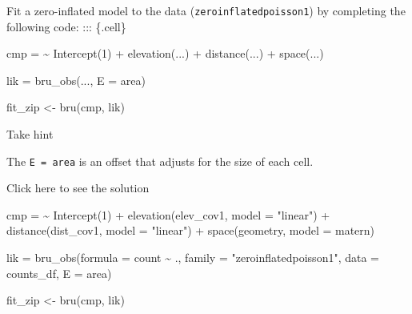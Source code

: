 \documentclass[
  letterpaper,
  DIV=11,
  numbers=noendperiod]{scrartcl}
\newenvironment{Shaded}{\begin{snugshade}}{\end{snugshade}}
\newcommand{\AttributeTok}[1]{\textcolor[rgb]{0.40,0.45,0.13}{#1}}
\newcommand{\DecValTok}[1]{\textcolor[rgb]{0.68,0.00,0.00}{#1}}
\newcommand{\ErrorTok}[1]{\textcolor[rgb]{0.68,0.00,0.00}{#1}}
\newcommand{\FunctionTok}[1]{\textcolor[rgb]{0.28,0.35,0.67}{#1}}
\newcommand{\NormalTok}[1]{\textcolor[rgb]{0.00,0.23,0.31}{#1}}
\newcommand{\OtherTok}[1]{\textcolor[rgb]{0.00,0.23,0.31}{#1}}
\newcommand{\SpecialCharTok}[1]{\textcolor[rgb]{0.37,0.37,0.37}{#1}}
\newcommand{\StringTok}[1]{\textcolor[rgb]{0.13,0.47,0.30}{#1}}
\begin{document}
\begin{tcolorbox}[enhanced jigsaw, bottomrule=.15mm, colbacktitle=quarto-callout-warning-color!10!white, toptitle=1mm, toprule=.15mm, colframe=quarto-callout-warning-color-frame, opacitybacktitle=0.6, opacityback=0, breakable, bottomtitle=1mm, left=2mm, titlerule=0mm, colback=white, rightrule=.15mm, leftrule=.75mm, arc=.35mm, title={Task}, coltitle=black]

Fit a zero-inflated model to the data (\texttt{zeroinflatedpoisson1}) by
completing the following code: ::: \{.cell\}

\begin{Shaded}
\begin{Highlighting}[]
\NormalTok{cmp }\OtherTok{=} \ErrorTok{\textasciitilde{}} \FunctionTok{Intercept}\NormalTok{(}\DecValTok{1}\NormalTok{) }\SpecialCharTok{+} \FunctionTok{elevation}\NormalTok{(...) }\SpecialCharTok{+} \FunctionTok{distance}\NormalTok{(...) }\SpecialCharTok{+} \FunctionTok{space}\NormalTok{(...)}

\NormalTok{lik }\OtherTok{=} \FunctionTok{bru\_obs}\NormalTok{(...,}
    \AttributeTok{E =}\NormalTok{ area)}

\NormalTok{fit\_zip }\OtherTok{\textless{}{-}} \FunctionTok{bru}\NormalTok{(cmp, lik)}
\end{Highlighting}
\end{Shaded}

\end{tcolorbox}

Take hint

The \texttt{E\ =\ area} is an offset that adjusts for the size of each
cell.

Click here to see the solution

\begin{Shaded}
\begin{Highlighting}[]

\NormalTok{cmp }\OtherTok{=} \ErrorTok{\textasciitilde{}} \FunctionTok{Intercept}\NormalTok{(}\DecValTok{1}\NormalTok{) }\SpecialCharTok{+} \FunctionTok{elevation}\NormalTok{(elev\_cov1, }\AttributeTok{model =} \StringTok{"linear"}\NormalTok{) }\SpecialCharTok{+} \FunctionTok{distance}\NormalTok{(dist\_cov1, }\AttributeTok{model =} \StringTok{"linear"}\NormalTok{) }\SpecialCharTok{+} \FunctionTok{space}\NormalTok{(geometry, }\AttributeTok{model =}\NormalTok{ matern)}



\NormalTok{lik }\OtherTok{=} \FunctionTok{bru\_obs}\NormalTok{(}\AttributeTok{formula =}\NormalTok{ count }\SpecialCharTok{\textasciitilde{}}\NormalTok{ .,}
    \AttributeTok{family =} \StringTok{"zeroinflatedpoisson1"}\NormalTok{, }
    \AttributeTok{data =}\NormalTok{ counts\_df,}
    \AttributeTok{E =}\NormalTok{ area)}

\NormalTok{fit\_zip }\OtherTok{\textless{}{-}} \FunctionTok{bru}\NormalTok{(cmp, lik)}
\end{Highlighting}
\end{Shaded}
\end{document}
